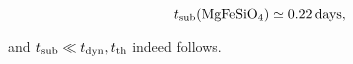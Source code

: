\documentclass[12pt,english,preprint]{aastex}
\newcommand{\su}[2]{#1_{\rm #2}}
\begin{document}
\begin{equation}
t_{{\rm sub}}({\rm MgFeSiO_{4})}\simeq0.22\,{\rm days\mbox{,}}
\end{equation}

\noindent and $t_{{\rm sub}}\ll t_{{\rm dyn}},\su{t}{th} $ indeed follows.









\end{document}
